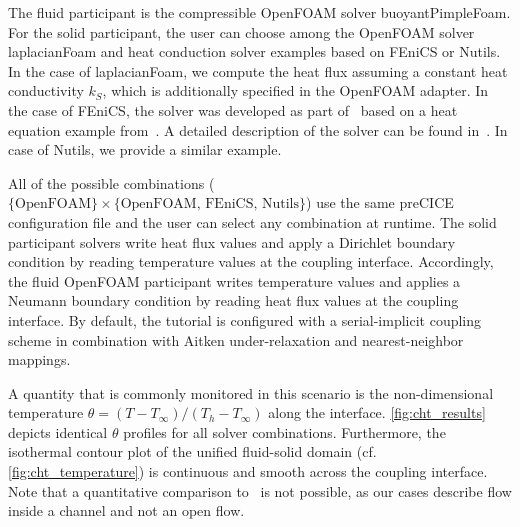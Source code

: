 
The fluid participant is the compressible OpenFOAM solver buoyantPimpleFoam.
For the solid participant, the user can choose among the OpenFOAM solver laplacianFoam and heat conduction solver examples based on FEniCS or Nutils.
In the case of laplacianFoam, we compute the heat flux assuming a constant heat conductivity $k_S$, which is additionally specified in the OpenFOAM adapter. In the case of FEniCS, the solver was developed as part of~\cite{QNWI} based on a heat equation example from~\cite{Langtangen2016}. A detailed description of the solver can be found in~\cite{rodenberg2021fenicsprecice}. In case of Nutils, we provide a similar example.

All of the possible combinations ($\{\text{OpenFOAM}\} \times \{\text{OpenFOAM, FEniCS, Nutils}\}$) use the same preCICE configuration file
and the user can select any combination at runtime. The solid participant solvers write heat flux values and apply a Dirichlet boundary condition by reading temperature values at the coupling interface. Accordingly, the fluid OpenFOAM participant writes temperature values and applies a Neumann boundary condition by reading heat flux values at the coupling interface. By default, the tutorial is configured with a serial-implicit coupling scheme in combination with Aitken under-relaxation and nearest-neighbor mappings.

A quantity that is commonly monitored in this scenario is the non-dimensional temperature $\theta = (T-T_\infty)/(T_h-T_\infty)$
along the interface. \autoref{fig:cht_results} depicts identical $\theta$ profiles for all solver combinations. Furthermore, the isothermal contour plot of the unified fluid-solid domain (cf. \autoref{fig:cht_temperature}) is continuous and smooth across the coupling interface.
Note that a quantitative comparison to~\cite{vynnycky1998forced} is not possible, as our cases describe flow inside a channel and not an open flow.



